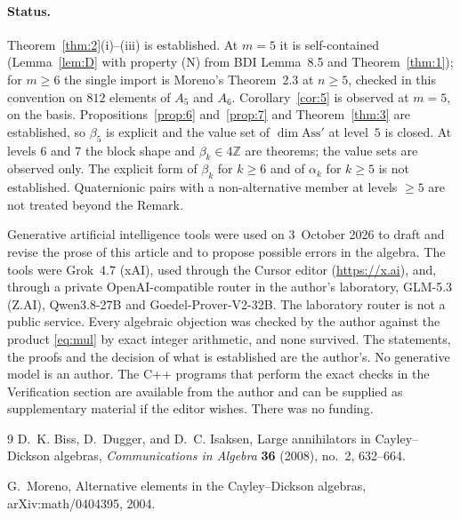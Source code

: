 \documentclass{baustms}
\theoremstyle{cupthm}
\numberwithin{equation}{section}
\newcommand{\Ass}{\mathrm{Ass}}
\begin{document}
\paragraph{Status.}
Theorem~\ref{thm:2}(i)--(iii) is established. At $m=5$ it is self-contained (Lemma~\ref{lem:D} with property (N) from BDI Lemma~8.5 and Theorem~\ref{thm:1}); for $m\ge 6$ the single import is Moreno's Theorem~2.3 at $n\ge 5$, checked in this convention on $812$ elements of $A_5$ and $A_6$. Corollary~\ref{cor:5} is observed at $m=5$, on the basis. Propositions~\ref{prop:6} and~\ref{prop:7} and Theorem~\ref{thm:3} are established, so $\beta_5$ is explicit and the value set of $\dim\Ass'$ at level~$5$ is closed. At levels $6$ and $7$ the block shape and $\beta_k\in 4\mathbb{Z}$ are theorems; the value sets are observed only. The explicit form of $\beta_k$ for $k\ge 6$ and of $\alpha_k$ for $k\ge 5$ is not established. Quaternionic pairs with a non-alternative member at levels $\ge 5$ are not treated beyond the Remark.

\ack
Generative artificial intelligence tools were used on 3~October 2026 to draft and revise the prose of this article and to propose possible errors in the algebra. The tools were Grok~4.7 (xAI), used through the Cursor editor (\url{https://x.ai}), and, through a private OpenAI-compatible router in the author's laboratory, GLM-5.3 (Z.AI), Qwen3.8-27B and Goedel-Prover-V2-32B. The laboratory router is not a public service. Every algebraic objection was checked by the author against the product \eqref{eq:mul} by exact integer arithmetic, and none survived. The statements, the proofs and the decision of what is established are the author's. No generative model is an author. The C++ programs that perform the exact checks in the Verification section are available from the author and can be supplied as supplementary material if the editor wishes. There was no funding.

\begin{thebibliography}{9}
D.~K. Biss, D.~Dugger, and D.~C. Isaksen,
Large annihilators in Cayley--Dickson algebras,
\emph{Communications in Algebra} \textbf{36} (2008), no.~2, 632--664.

G.~Moreno,
Alternative elements in the Cayley--Dickson algebras,
arXiv:math/0404395, 2004.
\end{thebibliography}
\end{document}
